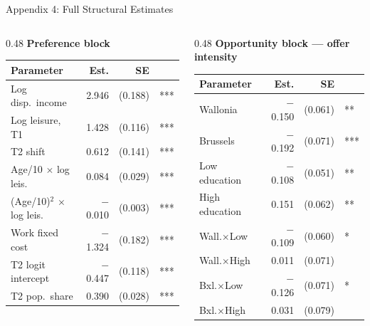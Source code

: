 \documentclass[aspectratio=169,11pt]{beamer}
\begin{document}
\begin{frame}{Appendix 4: Full Structural Estimates}

\begin{columns}[T]
\begin{column}{0.48\textwidth}
\centering
\footnotesize
\textbf{Preference block}\\[4pt]
\begin{tabular}{@{}l r r l@{}}
\toprule
\textbf{Parameter} & \textbf{Est.} & \textbf{SE} & \\
\midrule
Log disp.\ income         &  2.946 & (0.188) & *** \\
Log leisure, T1            &  1.428 & (0.116) & *** \\
T2 shift                   &  0.612 & (0.141) & *** \\
Age/10 $\times$ log leis.  &  0.084 & (0.029) & *** \\
(Age/10)$^2$ $\times$ log leis. & $-$0.010 & (0.003) & *** \\
Work fixed cost            & $-$1.324 & (0.182) & *** \\
T2 logit intercept         & $-$0.447 & (0.118) & *** \\
T2 pop.\ share             &  0.390 & (0.028) & *** \\
\bottomrule
\end{tabular}
\end{column}
\begin{column}{0.48\textwidth}
\centering
\scriptsize
\textbf{Opportunity block --- offer intensity}\\[3pt]
\begin{tabular}{@{}l r r l@{}}
\toprule
\textbf{Parameter} & \textbf{Est.} & \textbf{SE} & \\
\midrule
Wallonia              & $-$0.150 & (0.061) & ** \\
Brussels              & $-$0.192 & (0.071) & *** \\
Low education         & $-$0.108 & (0.051) & ** \\
High education        &  0.151 & (0.062) & ** \\
Wall.$\times$Low      & $-$0.109 & (0.060) & * \\
Wall.$\times$High     &  0.011 & (0.071) & \\
Bxl.$\times$Low       & $-$0.126 & (0.071) & * \\
Bxl.$\times$High      &  0.031 & (0.079) & \\
\bottomrule
\end{tabular}


\end{column}
\end{columns}
\end{frame}
\end{document}
